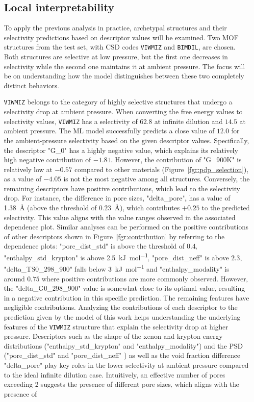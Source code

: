 \documentclass[main]{subfiles}
\begin{document}
\subsection{Local interpretability}

To apply the previous analysis in practice, archetypal structures and their selectivity predictions based on descriptor values will be examined. Two MOF structures from the test set, with CSD codes \texttt{VIWMIZ} and \texttt{BIMDIL}, are chosen. Both structures are selective at low pressure, but the first one decreases in selectivity while the second one maintains it at ambient pressure. The focus will be on understanding how the model distinguishes between these two completely distinct behaviors.

\texttt{VIWMIZ} belongs to the category of highly selective structures that undergo a selectivity drop at ambient pressure. When converting the free energy values to selectivity values, \texttt{VIWMIZ} has a selectivity of $62.8$ at infinite dilution and $14.5$ at ambient pressure. The ML model successfully predicts a close value of $12.0$ for the ambient-pressure selectivity based on the given descriptor values. Specifically, the descriptor "G\_0" has a highly negative value, which explains its relatively high negative contribution of $-1.81$. However, the contribution of "G\_900K" is relatively low at $-0.57$ compared to other materials (Figure~\ref{fgr:pdp_selection}), as a value of $-4.05$ is not the most negative among all structures. Conversely, the remaining descriptors have positive contributions, which lead to the selectivity drop. For instance, the difference in pore sizes, "delta\_pore", has a value of \SI{1.38}{\angstrom} (above the threshold of \SI{0.23}{\angstrom}), which contributes $+0.25$ to the predicted selectivity. This value aligns with the value ranges observed in the associated dependence plot. Similar analyses can be performed on the positive contributions of other descriptors shown in Figure~\ref{fgr:contribution} by referring to the dependence plots: "pore\_dist\_std" is above the threshold of $0.4$, "enthalpy\_std\_krypton" is above \SI{2.5}{\kilo\joule\per\mole}, "pore\_dist\_neff" is above $2.3$, "delta\_TS0\_298\_900" falls below \SI{3}{\kilo\joule\per\mole} and "enthalpy\_modality" is around $0.75$ where positive contributions are more commonly observed. However, the "delta\_G0\_298\_900" value is somewhat close to its optimal value, resulting in a negative contribution in this specific prediction. The remaining features have negligible contributions. Analyzing the contributions of each descriptor to the prediction given by the model of this work helps understanding the underlying features of the \texttt{VIWMIZ} structure that explain the selectivity drop at higher pressure. Descriptors such as the shape of the xenon and krypton energy distributions ("enthalpy\_std\_krypton" and "enthalpy\_modality") and the PSD ("pore\_dist\_std" and "pore\_dist\_neff" ) as well as the void fraction difference "delta\_pore" play key roles in the lower selectivity at ambient pressure compared to the ideal infinite dilution case. Intuitively, an effective number of pores exceeding 2 suggests the presence of different pore sizes, which aligns with the presence of 
\end{document}
